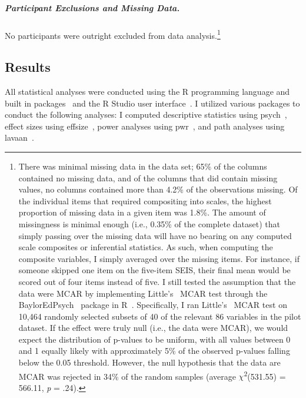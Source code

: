 \documentclass{sfuthesis}
\begin{document}
\subparagraph{Participant Exclusions and Missing Data.} No participants were outright excluded from data analysis.\footnote{There was minimal missing data in the data set; 65\% of the columns contained no missing data, and of the columns that did contain missing values, no columns contained more than 4.2\% of the observations missing. Of the individual items that required compositing into scales, the highest proportion of missing data in a given item was 1.8\%. The amount of missingness is minimal enough (i.e., 0.35\% of the complete dataset) that simply passing over the missing data will have no bearing on any computed scale composites or inferential statistics. As such, when computing the composite variables, I simply averaged over the missing items. For instance, if someone skipped one item on the five-item SEIS, their final mean would be scored out of four items instead of five. I still tested the assumption that the data were MCAR by implementing Little’s~\cite{little81} MCAR test through the BaylorEdPsych~\cite{baylor} package in R~\cite{rcore}. Specifically, I ran Little’s~\cite{little81} MCAR test on 10,464 randomly selected subsets of 40 of the relevant 86 variables in the pilot dataset. If the effect were truly null (i.e., the data were MCAR), we would expect the distribution of p-values to be uniform, with all values between 0 and 1 equally likely with approximately 5\% of the observed p-values falling below the 0.05 threshold. However, the null hypothesis that the data are MCAR was rejected in 34\% of the random samples (average $\chi$\textsuperscript{2}(531.55) = 566.11, \textit{p} = .24).}

\subsection{Results}

All statistical analyses were conducted using the R programming language and built in packages~\cite{rcore} and the R Studio user interface~\cite{rstudio16}. I utilized various packages to conduct the following analyses: I computed descriptive statistics using psych~\cite{revelle17}, effect sizes using effsize~\cite{torchiano17}, power analyses using pwr~\cite{champely18}, and path analyses using lavaan~\cite{rosseel12}. 
\end{document}
